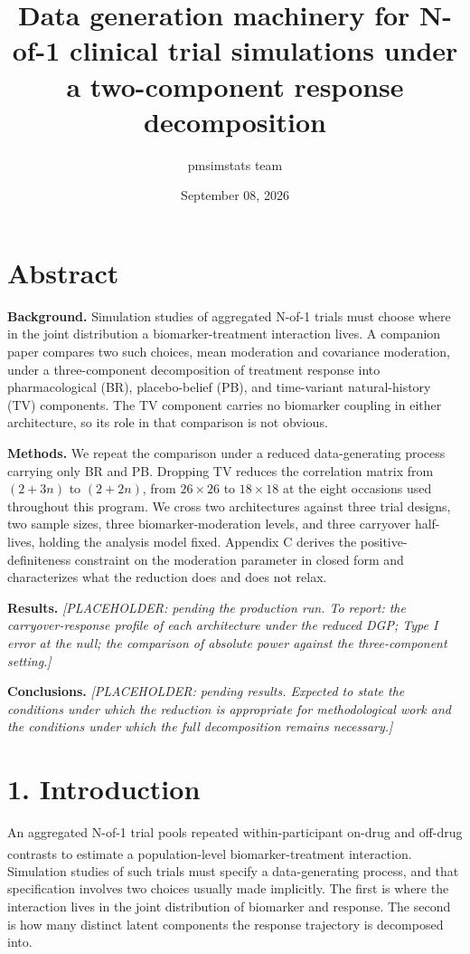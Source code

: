 \documentclass[
  11pt,
]{article}
\title{Data generation machinery for N-of-1 clinical trial simulations under a two-component response decomposition}
\author{pmsimstats team}
\date{September 08, 2026}
\begin{document}
\maketitle

{
\setcounter{tocdepth}{2}
\tableofcontents
}
\section{Abstract}

\textbf{Background.} Simulation studies of aggregated N-of-1 trials
must choose where in the joint distribution a biomarker-treatment
interaction lives. A companion paper compares two such choices, mean
moderation and covariance moderation, under a three-component
decomposition of treatment response into pharmacological (BR),
placebo-belief (PB), and time-variant natural-history (TV)
components. The TV component carries no biomarker coupling in either
architecture, so its role in that comparison is not obvious.

\textbf{Methods.} We repeat the comparison under a reduced
data-generating process carrying only BR and PB. Dropping TV reduces
the correlation matrix from \((2 + 3n)\) to \((2 + 2n)\), from \(26 \times
26\) to \(18 \times 18\) at the eight occasions used throughout this
program. We cross two architectures against three trial designs, two
sample sizes, three biomarker-moderation levels, and three carryover
half-lives, holding the analysis model fixed. Appendix C derives the
positive-definiteness constraint on the moderation parameter in
closed form and characterizes what the reduction does and does not
relax.

\textbf{Results.} \emph{[PLACEHOLDER: pending the production run.
To report: the carryover-response profile of each architecture under
the reduced DGP; Type I error at the null; the comparison of absolute
power against the three-component setting.]}

\textbf{Conclusions.} \emph{[PLACEHOLDER: pending results. Expected
to state the conditions under which the reduction is appropriate for
methodological work and the conditions under which the full
decomposition remains necessary.]}

\section{1. Introduction}

An aggregated N-of-1 trial pools repeated within-participant on-drug
and off-drug contrasts to estimate a population-level
biomarker-treatment interaction\textsuperscript{}. Simulation
studies of such trials must specify a data-generating process, and
that specification involves two choices usually made implicitly. The
first is where the interaction lives in the joint distribution of
biomarker and response. The second is how many distinct latent
components the response trajectory is decomposed into.
\end{document}
